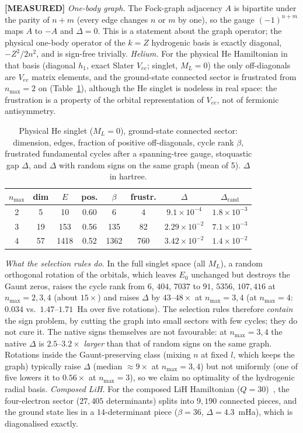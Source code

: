 \documentclass[twocolumn,pra,amsmath,amssymb,superscriptaddress]{revtex4-2}
\begin{document}
\textbf{[MEASURED]} \textit{One-body graph.}  The Fock-graph adjacency
$A$ is bipartite under the parity of $n+m$ (every edge changes $n$ or
$m$ by one), so the gauge $(-1)^{n+m}$ maps $A$ to $-A$ and $\Delta=0$.
This is a statement about the graph operator; the physical one-body
operator of the $k=Z$ hydrogenic basis is exactly diagonal,
$-Z^2/2n^2$, and is sign-free trivially.  \textit{Helium.}  For the
physical He Hamiltonian in that basis (diagonal $h_1$, exact Slater
$V_{ee}$; singlet, $M_L=0$) the only off-diagonals are $V_{ee}$ matrix
elements, and the ground-state connected sector is frustrated from
$n_{\max}=2$ on (Table~\ref{tab:sign}), although the He singlet is
nodeless in real space: the frustration is a property of the orbital
representation of $V_{ee}$, not of fermionic antisymmetry.
\begin{table}[h]
\caption{\label{tab:sign}Physical He singlet ($M_L=0$), ground-state
connected sector: dimension, edges, fraction of positive off-diagonals,
cycle rank $\beta$, frustrated fundamental cycles after a spanning-tree
gauge, stoquastic gap $\Delta$, and $\Delta$ with random signs on the
same graph (mean of 5).  $\Delta$ in hartree.}
\begin{ruledtabular}
\begin{tabular}{cccccccc}
$n_{\max}$ & dim & $E$ & pos. & $\beta$ & frustr. & $\Delta$ & $\Delta_{\mathrm{rand}}$ \\
\hline
2 & 5  & 10   & 0.60 & 6    & 4   & $9.1\times10^{-4}$ & $1.8\times10^{-3}$ \\
3 & 19 & 153  & 0.56 & 135  & 82  & $2.29\times10^{-2}$ & $7.1\times10^{-3}$ \\
4 & 57 & 1418 & 0.52 & 1362 & 760 & $3.42\times10^{-2}$ & $1.4\times10^{-2}$ \\
\end{tabular}
\end{ruledtabular}
\end{table}

\textit{What the selection rules do.}  In the full singlet space
(all $M_L$), a random orthogonal rotation of the orbitals, which leaves
$E_0$ unchanged but destroys the Gaunt zeros, raises the cycle rank
from $6$, $404$, $7037$ to $91$, $5356$, $107{,}416$ at
$n_{\max}=2,3,4$ (about $15\times$) and raises $\Delta$ by $43$--$48\times$
at $n_{\max}=3,4$ (at $n_{\max}=4$: $0.034$ vs.\ $1.47$--$1.71$~Ha over five
rotations).  The selection rules therefore \emph{contain} the sign
problem, by cutting the graph into small sectors with few cycles; they
do not cure it.  The native signs themselves are not favourable: at
$n_{\max}=3,4$ the native $\Delta$ is $2.5$--$3.2\times$ \emph{larger} than
that of random signs on the same graph.  Rotations inside the
Gaunt-preserving class (mixing $n$ at fixed $l$, which keeps the
graph) typically raise $\Delta$ (median $\approx 9\times$ at
$n_{\max}=3,4$) but not uniformly (one of five lowers it to
$0.56\times$ at $n_{\max}=3$), so we claim no optimality of the
hydrogenic radial basis.  \textit{Composed LiH.}  For the composed
LiH Hamiltonian ($Q=30$)~\cite{GeoVac_Paper14}, the four-electron
sector ($27{,}405$ determinants) splits into $9{,}190$ connected
pieces, and the ground state lies in a $14$-determinant piece
($\beta=36$, $\Delta=4.3$~mHa), which is diagonalised exactly.
\end{document}
